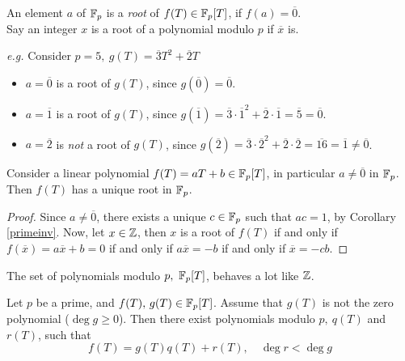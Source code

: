 \vspace*{1em}

\begin{definition}
An element $a$ of $\mathbb F_p$ is a \emph{root} of $f(T) \in \mathbb F_p[T]$, if $f(a) = \overline{0}$.\\[0.5em]
Say an integer $x$ is a root of a polynomial modulo $p$ if $\overline{x}$ is.
\end{definition}
\vspace*{0.5em}
\emph{e.g.} Consider $p = 5,\ g(T) = \overline{3}T^2 + \overline{2}T$
\begin{itemize}
\item $a = \overline{0}$ is a root of $g(T)$, since $g(\overline{0}) = \overline{0}$.
\item $a = \overline{1}$ is a root of $g(T)$, since $g(\overline{1}) = \overline{3}\cdot \overline{1}^2 + \overline{2}\cdot\overline{1} = \overline{5} = \overline{0}$.
\item $a = \overline{2}$ is \emph{not} a root of $g(T)$, since $g(\overline{2}) = \overline{3}\cdot \overline{2}^2 + \overline{2}\cdot\overline{2} = \overline{16} = \overline{1} \neq \overline{0}$.
\end{itemize}

\vspace*{1em}

\begin{proposition}\label{primlin}
Consider a linear polynomial $f(T) = aT + b \in \mathbb F_p[T]$, in particular $a \neq \overline{0}$ in $\mathbb F_p$. Then $f(T)$ has a unique root in $\mathbb F_p$.
\end{proposition}
\begin{proof}
Since $a \neq \overline{0}$, there exists a unique $c \in \mathbb F_p$ such that $ac = 1$, by Corollary \ref{primeinv}. Now, let $x \in \mathbb Z$, then $x$ is a root of $f(T)$ if and only if $f(\overline{x}) = a\overline{x} + b = 0$ if and only if $a\overline{x} = -b$ if and only if $\overline{x} = -cb$. 
\end{proof}

\vspace*{2em}

The set of polynomials modulo $p,\ \ff_p[T]$, behaves a lot like $\mathbb Z$.
\begin{theorem}\label{divalgfact}
Let $p$ be a prime, and $f(T),\,g(T) \in \mathbb F_p[T]$. Assume that $g(T)$ is not the zero polynomial ($\deg g\geq 0$). Then there exist polynomials modulo $p,\ q(T)$ and $r(T)$, such that
\[f(T) = g(T)q(T) + r(T),\quad \deg r < \deg g\]
\end{theorem}

